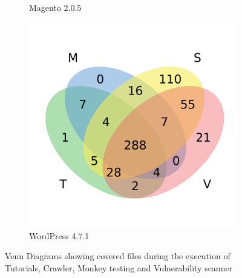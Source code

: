 \begin{figure}[t]
\begin{subfigure}[b]{0.24\textwidth}
          \caption{\scriptsize Magento 2.0.5}
          \label{fig:venn_mgt}
    \end{subfigure}
    \begin{subfigure}[b]{0.24\textwidth}
          \includegraphics[width=\textwidth]{figures/lim/venn_wp.pdf}
          \caption{\scriptsize WordPress 4.7.1}
          \label{fig:venn_wp}
    \end{subfigure}
  \caption{Venn Diagrams showing covered files during the execution of Tutorials, Crawler, Monkey testing and Vulnerability scanner}
  \label{fig:venncoverage}
\end{figure}

